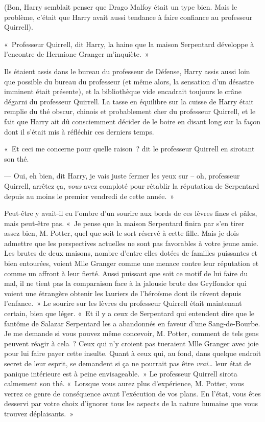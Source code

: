 (Bon, Harry semblait penser que Drago Malfoy était un type bien.
Mais le problème, c'était que Harry avait aussi tendance à faire confiance au professeur Quirrell).

\later

«~Professeur Quirrell, dit Harry, la haine que la maison Serpentard développe à l'encontre de Hermione Granger m'inquiète.~»

Ils étaient assis dans le bureau du professeur de Défense, Harry assis aussi loin que possible du bureau du professeur (et même alors, la sensation d'un désastre imminent était présente), et la bibliothèque vide encadrait toujours le crâne dégarni du professeur Quirrell.
La tasse en équilibre sur la cuisse de Harry était remplie du thé obscur, chinois et probablement cher du professeur Quirrell, et le fait que Harry ait dû consciemment décider de le boire en disant long sur la façon dont il s'était mis à réfléchir ces derniers temps.

«~Et ceci me concerne pour quelle raison~? dit le professeur Quirrell en sirotant son thé.

--- Oui, eh bien, dit Harry, je vais juste fermer les yeux sur -- oh, professeur Quirrell, arrêtez ça, \emph{vous} avez comploté pour rétablir la réputation de Serpentard depuis au moins le premier vendredi de cette année.~»

Peut-être y avait-il eu l'ombre d'un sourire aux bords de ces lèvres fines et pâles, mais peut-être pas.
«~Je pense que la maison Serpentard finira par s'en tirer assez bien, M. Potter, quel que soit le sort réservé à cette fille.
Mais je dois admettre que les perspectives actuelles ne sont pas favorables à votre jeune amie.
Les brutes de deux maisons, nombre d'entre elles dotées de familles puissantes et bien entourées, voient Mlle Granger comme une menace contre leur réputation et comme un affront à leur fierté.
Aussi puissant que soit ce motif de lui faire du mal, il ne tient pas la comparaison face à la jalousie brute des Gryffondor qui voient une étrangère obtenir les lauriers de l'héroïsme dont ils rêvent depuis l'enfance.~»
Le sourire sur les lèvres du professeur Quirrell était maintenant certain, bien que léger.
«~Et il y a ceux de Serpentard qui entendent dire que le fantôme de Salazar Serpentard les a abandonnés en faveur d'une Sang-de-Bourbe.
Je me demande si vous pouvez même concevoir, M. Potter, comment de tels gens peuvent réagir à cela~?
Ceux qui n'y croient pas tueraient Mlle Granger avec joie pour lui faire payer cette insulte.
Quant à ceux qui, au fond, dans quelque endroit secret de leur esprit, se demandent si ça ne pourrait pas être \emph{vrai}… leur état de panique intérieure est à peine envisageable.~»
Le professeur Quirrell sirota calmement son thé.
«~Lorsque vous aurez plus d'expérience, M. Potter, vous verrez ce genre de conséquence avant l'exécution de vos plans.
En l'état, vous êtes desservi par votre choix d'ignorer tous les aspects de la nature humaine que vous trouvez déplaisants.~»

